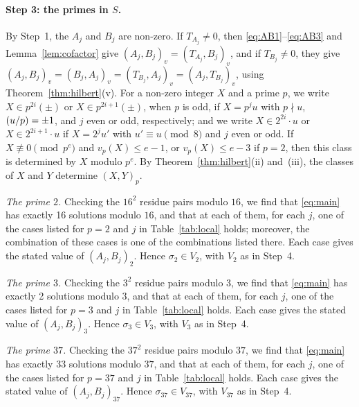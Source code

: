 \documentclass[11pt]{article}
\newcommand{\leg}[2]{\mathchoice{\biggl(\dfrac{#1}{#2}\biggr)}{(#1/#2)}{(#1/#2)}{(#1/#2)}}
\begin{document}
\paragraph{Step 3: the primes in $S$.} By Step~1, the $A_j$ and $B_j$ are non-zero. If $T_{A_j}\neq0$, then \eqref{eq:AB1}--\eqref{eq:AB3} and Lemma~\ref{lem:cofactor} give $(A_j,B_j)_v=(T_{A_j},B_j)_v$, and if $T_{B_j}\neq0$, they give $(A_j,B_j)_v=(B_j,A_j)_v=(T_{B_j},A_j)_v=(A_j,T_{B_j})_v$, using Theorem~\ref{thm:hilbert}(v). For a non-zero integer $X$ and a prime $p$, we write $X\in p^{2i}(\pm)$ or $X\in p^{2i+1}(\pm)$, when $p$ is odd, if $X=p^ju$ with $p\nmid u$, $\leg{u}{p}=\pm1$, and $j$ even or odd, respectively; and we write $X\in2^{2i}\cdot u$ or $X\in2^{2i+1}\cdot u$ if $X=2^ju'$ with $u'\equiv u\pmod 8$ and $j$ even or odd. If $X\not\equiv0\pmod{p^e}$ and $v_p(X)\leq e-1$, or $v_p(X)\leq e-3$ if $p=2$, then this class is determined by $X$ modulo $p^e$. By Theorem~\ref{thm:hilbert}(ii) and~(iii), the classes of $X$ and $Y$ determine $(X,Y)_p$.

\emph{The prime $2$.} Checking the $16^2$ residue pairs modulo $16$, we find that \eqref{eq:main} has exactly 16 solutions modulo $16$, and that at each of them, for each $j$, one of the cases listed for $p=2$ and $j$ in Table~\ref{tab:local} holds; moreover, the combination of these cases is one of the combinations listed there. Each case gives the stated value of $(A_j,B_j)_{2}$. Hence $\sigma_{2}\in V_{2}$, with $V_{2}$ as in Step~4.

\emph{The prime $3$.} Checking the $3^2$ residue pairs modulo $3$, we find that \eqref{eq:main} has exactly 2 solutions modulo $3$, and that at each of them, for each $j$, one of the cases listed for $p=3$ and $j$ in Table~\ref{tab:local} holds. Each case gives the stated value of $(A_j,B_j)_{3}$. Hence $\sigma_{3}\in V_{3}$, with $V_{3}$ as in Step~4.

\emph{The prime $37$.} Checking the $37^2$ residue pairs modulo $37$, we find that \eqref{eq:main} has exactly 33 solutions modulo $37$, and that at each of them, for each $j$, one of the cases listed for $p=37$ and $j$ in Table~\ref{tab:local} holds. Each case gives the stated value of $(A_j,B_j)_{37}$. Hence $\sigma_{37}\in V_{37}$, with $V_{37}$ as in Step~4.
\end{document}
